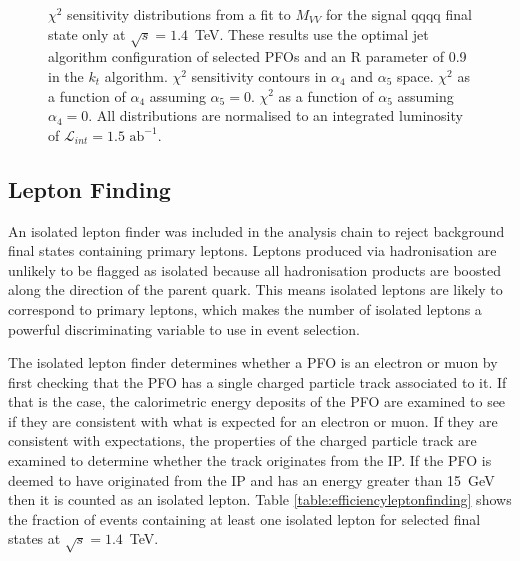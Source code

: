 \begin{figure}[h!]
\caption[$\chi^{2}$ sensitivity distributions from a fit to the invariant mass of the visible system, $M_{VV}$, for the signal {\nu}{\nu}qqqq final state only at $\sqrt{s}=1.4$~TeV.  These results use the optimal jet algorithm configuration of selected PFOs and an R parameter of 0.9 in the $k_{t}$ algorithm.  \protect{} $\chi^{2}$ sensitivity contours in $\alpha_{4}$ and $\alpha_{5}$ space.  \protect{} $\chi^{2}$ as a function of $\alpha_{4}$ assuming $\alpha_{5} = 0$.  \protect{} $\chi^{2}$ as a function of $\alpha_{5}$ assuming $\alpha_{4} = 0$.  All distributions are normalised to an integrated luminosity of $\mathcal{L}_{int} = 1.5\text{ ab}^{-1}$.]{$\chi^{2}$ sensitivity distributions from a fit to $M_{VV}$ for the signal {\nu}{\nu}qqqq final state only at $\sqrt{s}=1.4$~TeV.  These results use the optimal jet algorithm configuration of selected PFOs and an R parameter of 0.9 in the $k_{t}$ algorithm.  \protect{} $\chi^{2}$ sensitivity contours in $\alpha_{4}$ and $\alpha_{5}$ space.  \protect{} $\chi^{2}$ as a function of $\alpha_{4}$ assuming $\alpha_{5} = 0$.  \protect{} $\chi^{2}$ as a function of $\alpha_{5}$ assuming $\alpha_{4} = 0$.  All distributions are normalised to an integrated luminosity of $\mathcal{L}_{int} = 1.5\text{ ab}^{-1}$.}
\label{fig:allchi2jetalgoideal1400GeV}
\end{figure}


\subsection{Lepton Finding} 
\label{sec:isolatedleptonfinding}
An isolated lepton finder \cite{Wendt:2007iw} was included in the analysis chain to reject background final states containing primary leptons.  Leptons produced via hadronisation are unlikely to be flagged as isolated because all hadronisation products are boosted along the direction of the parent quark.  This means isolated leptons are likely to correspond to primary leptons, which makes the number of isolated leptons a powerful discriminating variable to use in event selection.  

The isolated lepton finder determines whether a PFO is an electron or muon by first checking that the PFO has a single charged particle track associated to it.  If that is the case, the calorimetric energy deposits of the PFO are examined to see if they are consistent with what is expected for an electron or muon.  If they are consistent with expectations, the properties of the charged particle track are examined to determine whether the track originates from the IP.  {If the PFO is deemed to have originated from the IP and has an energy greater than 15~GeV then it is counted as an isolated lepton.}  Table \ref{table:efficiencyleptonfinding} shows the fraction of events {containing at least one isolated lepton} for selected final states at $\sqrt{s}=1.4$~TeV.  

